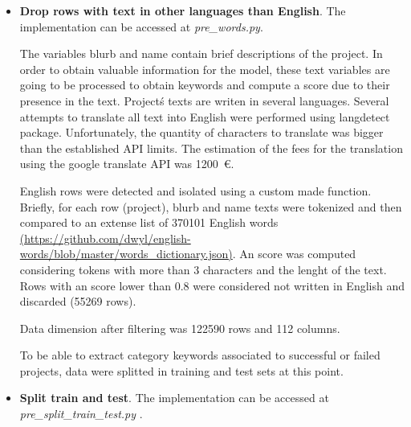 \documentclass{article}
\begin{document}
{\begin{itemize}
\begin{itemize}
	The number of columns was reduced to 125.
	
	\item  Currency pruning.
	The implementation can be accessed at \emph{pre\_currency\_pruning.py }.
	
	Currency encodes 14 different levels. Plots and percentages of succesfull projects were performed for 'currency\_orig'. Currencies with more than 55\% of successful projects were retained (GBP, HKD, SGD, JPY) and compared to the retained countries. All currency levels were dropped because the selected currencies correspond to countries that were already selected and the information was redundant.
	
	The number of columns was reduced to 112.
        
    \end{itemize}
    \item \textbf{Drop rows with text in other languages than English}.
    The implementation can be accessed at \emph{pre\_words.py}.
    
    The variables blurb and name contain brief descriptions of the project. In order to obtain valuable information for the model, these text variables are going to be processed to obtain keywords and compute a score due to their presence in the text. Project\'s texts are writen in several languages. Several attempts to translate all text into English were performed using langdetect package. Unfortunately, the quantity of characters to translate was bigger than the established API limits. The estimation of the fees for the translation using the google translate API was 1200~\euro.
    
    English rows were detected and isolated using a custom made function. Briefly, for each row (project), blurb and name texts were tokenized and then compared to an extense list of 370101 English words \url{(https://github.com/dwyl/english-words/blob/master/words_dictionary.json)}. An score was computed considering tokens with more than 3 characters and the lenght of the text. Rows with an score lower than 0.8 were considered not written in English and discarded (55269 rows).
    
    Data dimension after filtering was 122590 rows and 112 columns.
    
    To be able to extract category keywords associated to successful or failed projects, data were splitted in training and test sets at this point.
    
    \item \textbf{Split train and test}.
    The implementation can be accessed at \emph{pre\_split\_train\_test.py }.
    

\end{itemize}}
\end{document}
